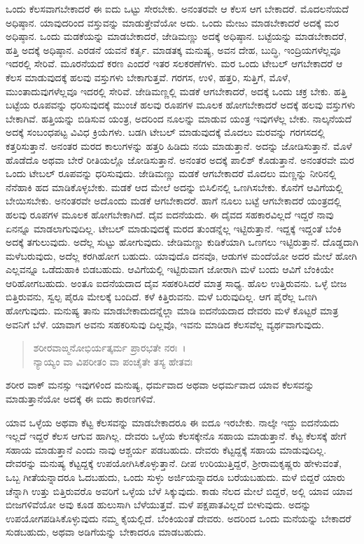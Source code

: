 ಒಂದು ಕೆಲಸವಾಗಬೇಕಾದರೆ ಈ ಐದು ಒಟ್ಟು ಸೇರಬೇಕು. ಅನಂತರವೇ ಆ ಕೆಲಸ ಆಗ ಬೇಕಾದರೆ. ಮೊದಲನೆಯದೆ ಅಧಿಷ್ಠಾನ. ಯಾವುದರಿಂದ ವಸ್ತುವನ್ನು ಮಾಡುತ್ತೇವೆಯೋ ಅದು. ಒಂದು ಮೇಜು ಮಾಡಬೇಕಾದರೆ ಅದಕ್ಕೆ ಮರ ಅಧಿಷ್ಠಾನ. ಒಂದು ಮಡಕೆಯನ್ನು ಮಾಡಬೇಕಾದರೆ, ಜೇಡಿಮಣ್ಣು ಅದಕ್ಕೆ ಅಧಿಷ್ಠಾನ. ಬಟ್ಟೆಯನ್ನು ಮಾಡಬೇಕಾದರೆ, ಹತ್ತಿ ಅದಕ್ಕೆ ಅಧಿಷ್ಠಾನ. ಎರಡನೆ ಯವನೆ ಕರ್ತೃ. ಮಾಡತಕ್ಕ ಮನುಷ್ಯ, ಅವನ ದೇಹ, ಬುದ್ಧಿ, ಇಂದ್ರಿಯಗಳೆಲ್ಲವೂ ಇದರಲ್ಲಿ ಸೇರಿವೆ. ಮೂರನೆಯದೆ ಕರಣ ಎಂದರೆ ಇತರ ಸಲಕರಣೆಗಳು. ಮರ ಒಂದು ಟೇಬಲ್ ಆಗಬೇಕಾದರೆ ಆ ಕೆಲಸ ಮಾಡುವುದಕ್ಕೆ ಹಲವು ವಸ್ತುಗಳು ಬೇಕಾಗುತ್ತವೆ. ಗರಗಸ, ಉಳಿ, ಹತ್ತರಿ, ಸುತ್ತಿಗೆ, ಮೊಳೆ, ಮುಂತಾದುವುಗಳೆಲ್ಲವೂ ಇದರಲ್ಲಿ ಸೇರಿವೆ. ಜೇಡಿಮಣ್ಣಲ್ಲಿ ಮಡಕೆ ಆಗಬೇಕಾದರೆ, ಅದಕ್ಕೆ ಒಂದು ಚಕ್ರ ಬೇಕು. ಹತ್ತಿ ಬಟ್ಟೆಯ ರೂಪವನ್ನು ಧರಿಸುವುದಕ್ಕೆ ಮುಂಚೆ ಹಲವು ರೂಪಗಳ ಮೂಲಕ ಹೋಗಬೇಕಾದರೆ ಅದಕ್ಕೆ ಹಲವು ವಸ್ತುಗಳು ಬೇಕಾಗಿವೆ. ಹತ್ತಿಯನ್ನು ಬಿಡಿಸುವ ಯಂತ್ರ, ಅದರಿಂದ ನೂಲನ್ನು ಮಾಡುವ ಯಂತ್ರ ಇವುಗಳೆಲ್ಲ ಬೇಕು. ನಾಲ್ಕನೆಯದೆ ಅದಕ್ಕೆ ಸಂಬಂಧಪಟ್ಟ ವಿವಿಧ ಕ್ರಿಯೆಗಳು. ಬಡಗಿ ಟೇಬಲ್ ಮಾಡುವುದಕ್ಕೆ ಮೊದಲು ಮರವನ್ನು ಗರಗಸದಲ್ಲಿ ಕತ್ತರಿಸುತ್ತಾನೆ. ಅನಂತರ ಮರದ ಕಾಲುಗಳನ್ನು ಹತ್ತರಿ ಹಿಡಿದು ನಯ ಮಾಡುತ್ತಾನೆ. ಅದನ್ನು ಜೋಡಿಸುತ್ತಾನೆ. ಮೊಳೆ ಹೊಡೆದೊ ಅಥವಾ ಬೇರೆ ರೀತಿಯಲ್ಲೊ ಜೋಡಿಸುತ್ತಾನೆ. ಅನಂತರ ಅದಕ್ಕೆ ಪಾಲಿಶ್ ಕೊಡುತ್ತಾನೆ. ಅನಂತರವೇ ಮರ ಒಂದು ಟೇಬಲ್ ರೂಪವನ್ನು ಧರಿಸುವುದು. ಜೇಡಿಮಣ್ಣು ಮಡಕೆ ಆಗಬೇಕಾದರೆ ಮೊದಲು ಮಣ್ಣನ್ನು ನೀರಿನಲ್ಲಿ ನೆನೆಹಾಕಿ ಹದ ಮಾಡಿಕೊಳ್ಳಬೇಕು. ಮಡಕೆ ಆದ ಮೇಲೆ ಅದನ್ನು ಬಿಸಿಲಿನಲ್ಲಿ ಒಣಗಿಸಬೇಕು. ಕೊನೆಗೆ ಆವಿಗೆಯಲ್ಲಿ ಬೇಯಿಸಬೇಕು. ಅನಂತರವೇ ಅದೊಂದು ಮಡಕೆ ಆಗಬೇಕಾದರೆ. ಹಾಗೆ ನೂಲು ಬಟ್ಟೆ ಆಗಬೇಕಾದರೆ ಯಂತ್ರದಲ್ಲಿ ಹಲವು ರೂಪಗಳ ಮೂಲಕ ಹೋಗಬೇಕಾಗಿದೆ. ದೈವ ಐದನೆಯದು. ಈ ದೈವದ ಸಹಕಾರವಿಲ್ಲದೆ ಇದ್ದರೆ ನಾವು ಏನನ್ನೂ ಮಾಡಲಾಗುವುದಿಲ್ಲ. ಟೇಬಲ್ ಮಾಡುವುದಕ್ಕೆ ಮರದ ತುಂಡನ್ನೆಲ್ಲ ಇಟ್ಟಿರುತ್ತಾನೆ. ಇದ್ದಕ್ಕೆ ಇದ್ದಂತೆ ಬೆಂಕಿ ಅದಕ್ಕೆ ತಗುಲುವುದು. ಅದೆಲ್ಲ ಸುಟ್ಟು ಹೋಗುವುದು. ಜೇಡಿಮಣ್ಣು ಕುಡಿಕೆಯಾಗಿ ಒಣಗಲು ಇಟ್ಟಿರುತ್ತಾನೆ. ದೊಡ್ಡದಾಗಿ ಮಳೆಬರುವುದು, ಅದೆಲ್ಲ ಕರಗಿಹೋಗ ಬಹುದು. ಯಾವುದೊ ದನವೊ, ಆಡುಗಳ ಮಂದೆಯೋ ಅದರ ಮೇಲೆ ಹೋಗಿ ಎಲ್ಲವನ್ನೂ ಒಡೆದುಹಾಕಿ ಬಿಡಬಹುದು. ಆವಿಗೆಯಲ್ಲಿ ಇಟ್ಟಿರುವಾಗ ಜೋರಾಗಿ ಮಳೆ ಬಂದು ಆವಿಗೆ ಬೆಂಕಿಯೇ ಆರಿಹೋಗಬಹುದು. ಅಂತೂ ಐದನೆಯದಾದ ದೈವ ಸಹಕರಿಸಿದರೆ ಮಾತ್ರ ಸಾಧ್ಯ. ಹೊಲ ಉತ್ತಿರುವನು. ಒಳ್ಳೆ ಬೀಜ ಬಿತ್ತಿರುವನು, ಸ್ವಲ್ಪ ಪೈರೂ ಮೇಲಕ್ಕೆ ಬಂದಿದೆ. ಕಳೆ ಕಿತ್ತಿರುವನು. ಮಳೆ ಬರುವುದಿಲ್ಲ. ಆಗ ಪೈರೆಲ್ಲ ಒಣಗಿ ಹೋಗುವುದು. ಮನುಷ್ಯ ತಾನು ಮಾಡಬೇಕಾದುದನ್ನೆಲ್ಲಾ ಮಾಡಿ ಐದನೆಯದಾದ ದೇವರು ಮಳೆ ಕೊಟ್ಟರೆ ಮಾತ್ರ ಅವನಿಗೆ ಬೆಳೆ. ಯಾವಾಗ ಅವನು ಸಹಕರಿಸುವು ದಿಲ್ಲವೊ, ಇವನು ಮಾಡಿದ ಕೆಲಸವೆಲ್ಲ ವ್ಯರ್ಥವಾಗುವುದು.

\begin{verse}
ಶರೀರವಾಙ್ಮನೋಭಿರ್ಯತ್ಕರ್ಮ ಪ್ರಾರಭತೇ ನರಃ~।\\ನ್ಯಾಯ್ಯಂ ವಾ ವಿಪರೀತಂ ವಾ ಪಂಚೈತೇ ತಸ್ಯ ಹೇತವಃ 
\end{verse}

{\small ಶರೀರ ವಾಕ್ ಮನಸ್ಸು ಇವುಗಳಿಂದ ಮನುಷ್ಯ, ಧರ್ಮವಾದ ಅಥವಾ ಅಧರ್ಮವಾದ ಯಾವ ಕೆಲಸವನ್ನು ಮಾಡುತ್ತಾನೆಯೋ ಅದಕ್ಕೆ ಈ ಐದು ಕಾರಣಗಳಿವೆ.}

ಯಾವ ಒಳ್ಳೆಯ ಅಥವಾ ಕೆಟ್ಟ ಕೆಲಸವನ್ನು ಮಾಡಬೇಕಾದರೂ ಈ ಐದೂ ಇರಬೇಕು. ನಾಲ್ಕೇ ಇದ್ದು ಐದನೆಯದು ಇಲ್ಲದೆ ಇದ್ದರೆ ಕೆಲಸ ಆಗುವ ಹಾಗಿಲ್ಲ. ದೇವರು ಒಳ್ಳೆಯ ಕೆಲಸಕ್ಕೇನೊ ಸಹಾಯ ಮಾಡುತ್ತಾನೆ. ಕೆಟ್ಟ ಕೆಲಸಕ್ಕೆ ಹೇಗೆ ಸಹಾಯ ಮಾಡುತ್ತಾನೆ ಎಂದು ನಾವು ಆಶ್ಚರ್ಯ ಪಡಬಹುದು. ದೇವರು ಕೆಟ್ಟದ್ದಕ್ಕೆ ಸಹಾಯ ಮಾಡುವುದಿಲ್ಲ. ದೇವರನ್ನು ಮನುಷ್ಯ ಕೆಟ್ಟದ್ದಕ್ಕೆ ಉಪಯೋಗಿಸಿಕೊಳ್ಳುತ್ತಾನೆ. ದೀಪ ಉರಿಯುತ್ತಿದ್ದರೆ, ಶ‍್ರೀರಾಮಕೃಷ್ಣರು ಹೇಳುವಂತೆ, ಒಬ್ಬ ಗೀತೆಯನ್ನಾದರೂ ಓದಬಹುದು, ಒಂದು ಸುಳ್ಳು ಅರ್ಜಿಯನ್ನಾದರೂ ಬರೆಯಬಹುದು. ಮಳೆ ಬಿದ್ದರೆ ಯಾರು ಚೆನ್ನಾಗಿ ಉತ್ತು ಬಿತ್ತಿರುವರೊ ಅವರಿಗೆ ಒಳ್ಳೆಯ ಬೆಳೆ ಸಿಕ್ಕುವುದು. ಕಾಡು ನೆಲದ ಮೇಲೆ ಬಿದ್ದರೆ, ಅಲ್ಲಿ ಯಾವ ಯಾವ ಬೀಜಗಳಿವೆಯೋ ಅವು ಕೂಡ ಹುಲುಸಾಗಿ ಬೆಳೆಯುತ್ತವೆ. ಮಳೆ ಪಕ್ಷಪಾತವಿಲ್ಲದೆ ಬೀಳುವುದು. ಅದನ್ನು ಉಪಯೋಗಪಡಿಸಿಕೊಳ್ಳುವುದು ನಮ್ಮ ಕೈಯಲ್ಲಿದೆ. ಬೆಂಕಿಯಂತೆ ದೇವರು. ಅದರಿಂದ ಒಂದು ಮನೆಯನ್ನು ಬೇಕಾದರೆ ಸುಡಬಹುದು, ಅಥವಾ ಅಡಿಗೆಯನ್ನು ಬೇಕಾದರೂ ಮಾಡಬಹುದು.

